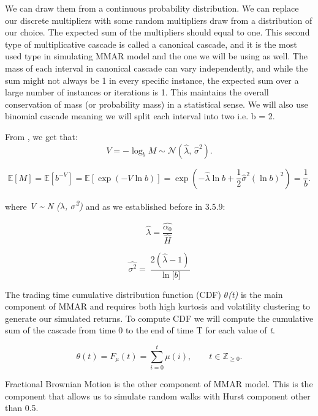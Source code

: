 \documentclass[12pt,a4paper]{report}
\numberwithin{equation}{section}
\begin{document}
We can draw them from a continuous probability distribution. We can
replace our discrete multipliers with some random multipliers draw from
a distribution of our choice. The expected sum of the multipliers should
equal to one. This second type of multiplicative cascade is called a
canonical cascade, and it is the most used type in simulating MMAR model
and the one we will be using as well. The mass of each interval in
canonical cascade can vary independently, and while the sum might not
always be 1 in every specific instance, the expected sum over a large
number of instances or iterations is 1. This maintains the overall
conservation of mass (or probability mass) in a statistical sense. We
will also use binomial cascade meaning we will split each interval into
two i.e. b = 2.

From \cite{mandelbrot1997multifractal_13}, we get that:
\begin{equation}\label{eq:3.1.13}
V=-\log_{b} M \sim \mathcal{N}\!\left(\widehat{\lambda},\,\widehat{\sigma}^{2}\right).
\end{equation}

\begin{equation}\label{eq:3.1.14}
\mathbb{E}[M]
=\mathbb{E}\!\left[b^{-V}\right]
=\mathbb{E}\!\left[\exp\!\left(-V\ln b\right)\right]
=\exp\!\left(-\widehat{\lambda}\ln b + \frac{1}{2}\widehat{\sigma}^{2}(\ln b)^{2}\right)
=\frac{1}{b}.
\end{equation}

where \emph{V \textasciitilde{} N ($\lambda$,
$\sigma$\textsuperscript{2}\textsubscript{})} and as we established before in
3.5.9:

\[\widehat{\lambda} = \frac{\widehat{\alpha_{0}}}{\widehat{H}}\]

\[\widehat{\sigma^{2}} = \ \frac{2(\widehat{\lambda} - 1)}{\ln\lbrack b\rbrack}\]

The trading time cumulative distribution function (CDF) \emph{$\theta$(t)} is
the main component of MMAR and requires both high kurtosis and
volatility clustering to generate our simulated returns. To compute CDF
we will compute the cumulative sum of the cascade from time 0 to the end
of time T for each value of \emph{t}.

\begin{equation}\label{eq:3.1.14}
\theta(t)=F_{\mu}(t)=\sum_{i=0}^{t}\mu(i), \qquad t\in\mathbb{Z}_{\ge 0}.
\end{equation}

Fractional Brownian Motion is the other component of MMAR model. This is
the component that allows us to simulate random walks with Hurst
component other than 0.5.
\end{document}
